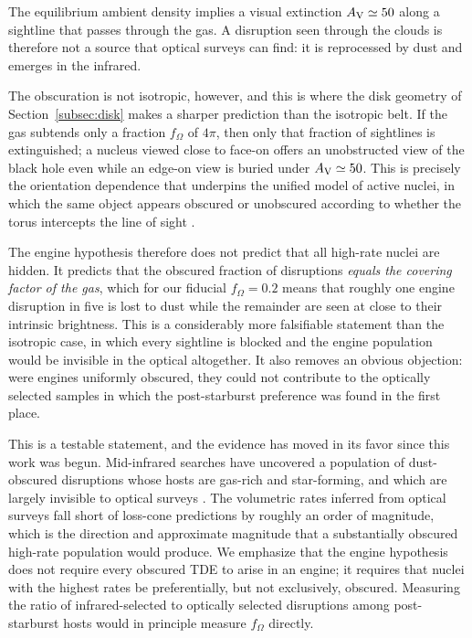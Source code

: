 \documentclass[preprint2]{aastex}
\begin{document}
The equilibrium ambient density implies a visual extinction $A_{\rm V} \simeq 50$ along a sightline that passes through the gas. A disruption seen through the clouds is therefore not a source that optical surveys can find: it is reprocessed by dust and emerges in the infrared.

The obscuration is not isotropic, however, and this is where the disk geometry of Section~\ref{subsec:disk} makes a sharper prediction than the isotropic belt. If the gas subtends only a fraction $f_{\Omega}$ of $4\pi$, then only that fraction of sightlines is extinguished; a nucleus viewed close to face-on offers an unobstructed view of the black hole even while an edge-on view is buried under $A_{\rm V} \simeq 50$. This is precisely the orientation dependence that underpins the unified model of active nuclei, in which the same object appears obscured or unobscured according to whether the torus intercepts the line of sight \citep{Netzer:2015a,RamosAlmeida:2017a}.

The engine hypothesis therefore does not predict that all high-rate nuclei are hidden. It predicts that the obscured fraction of disruptions {\it equals the covering factor of the gas}, which for our fiducial $f_{\Omega} = 0.2$ means that roughly one engine disruption in five is lost to dust while the remainder are seen at close to their intrinsic brightness. This is a considerably more falsifiable statement than the isotropic case, in which every sightline is blocked and the engine population would be invisible in the optical altogether. It also removes an obvious objection: were engines uniformly obscured, they could not contribute to the optically selected samples in which the post-starburst preference was found in the first place.

This is a testable statement, and the evidence has moved in its favor since this work was begun. Mid-infrared searches have uncovered a population of dust-obscured disruptions whose hosts are gas-rich and star-forming, and which are largely invisible to optical surveys \citep{Masterson:2024a}. The volumetric rates inferred from optical surveys \citep{vanVelzen:2021a,Yao:2023a} fall short of loss-cone predictions by roughly an order of magnitude, which is the direction and approximate magnitude that a substantially obscured high-rate population would produce. We emphasize that the engine hypothesis does not require every obscured TDE to arise in an engine; it requires that nuclei with the highest rates be preferentially, but not exclusively, obscured. Measuring the ratio of infrared-selected to optically selected disruptions among post-starburst hosts would in principle measure $f_{\Omega}$ directly.
\end{document}
